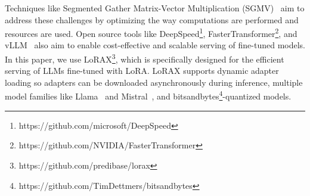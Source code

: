 Techniques like Segmented Gather Matrix-Vector Multiplication (SGMV)~\cite{38chen2023punica} aim to address these challenges by optimizing the way computations are performed and resources are used. Open source tools like DeepSpeed\footnote{https://github.com/microsoft/DeepSpeed}, FasterTransformer\footnote{https://github.com/NVIDIA/FasterTransformer}, and vLLM~\cite{41kwon2023efficient} also aim to enable cost-effective and scalable serving of fine-tuned models. In this paper, we use LoRAX\footnote{https://github.com/predibase/lorax}, which is specifically designed for the efficient serving of LLMs fine-tuned with LoRA. LoRAX supports dynamic adapter loading so adapters can be downloaded asynchronously during inference, multiple model families like Llama~\cite{4llama} and Mistral~\cite{5mistral}, and bitsandbytes\footnote{https://github.com/TimDettmers/bitsandbytes}-quantized models.
